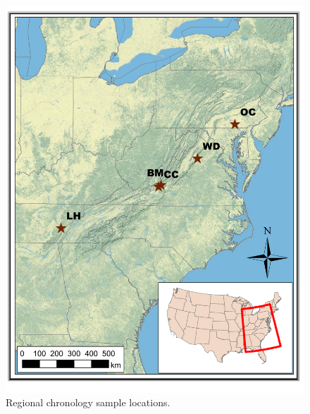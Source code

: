 
\begin{figure}
\centering
\includegraphics[width=6in]{figures/NewClimateNADEF.pdf}
\caption{Regional chronology sample locations.}
\label{fig:map}
\end{figure}

